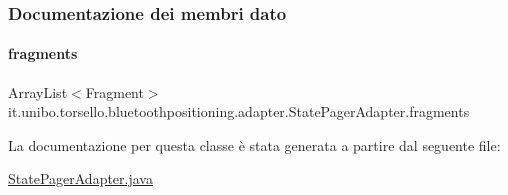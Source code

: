 \subsubsection{Documentazione dei membri dato}
\hypertarget{classit_1_1unibo_1_1torsello_1_1bluetoothpositioning_1_1adapter_1_1StatePagerAdapter_a6d30ff8266b65b268d46d03eb30da1db_a6d30ff8266b65b268d46d03eb30da1db}{}\label{classit_1_1unibo_1_1torsello_1_1bluetoothpositioning_1_1adapter_1_1StatePagerAdapter_a6d30ff8266b65b268d46d03eb30da1db_a6d30ff8266b65b268d46d03eb30da1db} 
\paragraph{\texorpdfstring{fragments}{fragments}}
{\footnotesize\ttfamily Array\+List$<$Fragment$>$ it.\+unibo.\+torsello.\+bluetoothpositioning.\+adapter.\+State\+Pager\+Adapter.\+fragments\hspace{0.3cm}{\ttfamily [private]}}



La documentazione per questa classe è stata generata a partire dal seguente file\+:\begin{DoxyCompactItemize}
\item 
\hyperlink{StatePagerAdapter_8java}{State\+Pager\+Adapter.\+java}\end{DoxyCompactItemize}
